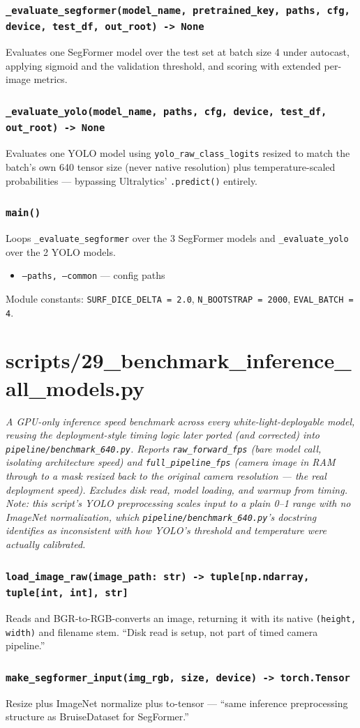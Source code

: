 \documentclass[11pt]{article}
\newcommand{\role}[1]{\par\noindent\textit{#1}\par\vspace{0.5em}}
\newcommand{\func}[1]{\subsubsection*{\texttt{#1}}}
\newcommand{\cliarg}[2]{\item \texttt{#1} --- #2}
\begin{document}
\func{\_evaluate\_segformer(model\_name, pretrained\_key, paths, cfg, device, test\_df, out\_root) -> None}
Evaluates one SegFormer model over the test set at batch size 4 under autocast,
applying sigmoid and the validation threshold, and scoring with extended
per-image metrics.

\func{\_evaluate\_yolo(model\_name, paths, cfg, device, test\_df, out\_root) -> None}
Evaluates one YOLO model using \texttt{yolo\_raw\_class\_logits} resized to
match the batch's own 640 tensor size (never native resolution) plus
temperature-scaled probabilities --- bypassing Ultralytics' \texttt{.predict()}
entirely.

\func{main()}
Loops \texttt{\_evaluate\_segformer} over the 3 SegFormer models and
\texttt{\_evaluate\_yolo} over the 2 YOLO models.

\begin{itemize}[nosep]
\cliarg{--paths, --common}{config paths}
\end{itemize}
Module constants: \texttt{SURF\_DICE\_DELTA = 2.0}, \texttt{N\_BOOTSTRAP = 2000}, \texttt{EVAL\_BATCH = 4}.

\section{scripts/29\_benchmark\_inference\_all\_models.py}
\role{A GPU-only inference speed benchmark across every white-light-deployable
model, reusing the deployment-style timing logic later ported (and corrected)
into \texttt{pipeline/benchmark\_640.py}. Reports \texttt{raw\_forward\_fps}
(bare model call, isolating architecture speed) and \texttt{full\_pipeline\_fps}
(camera image in RAM through to a mask resized back to the \emph{original}
camera resolution --- the real deployment speed). Excludes disk read, model
loading, and warmup from timing. Note: this script's YOLO preprocessing scales
input to a plain 0--1 range with no ImageNet normalization, which
\texttt{pipeline/benchmark\_640.py}'s docstring identifies as inconsistent with
how YOLO's threshold and temperature were actually calibrated.}

\func{load\_image\_raw(image\_path: str) -> tuple[np.ndarray, tuple[int, int], str]}
Reads and BGR-to-RGB-converts an image, returning it with its native
\texttt{(height, width)} and filename stem. ``Disk read is setup, not part of
timed camera pipeline.''

\func{make\_segformer\_input(img\_rgb, size, device) -> torch.Tensor}
Resize plus ImageNet normalize plus to-tensor --- ``same inference
preprocessing structure as BruiseDataset for SegFormer.''
\end{document}
